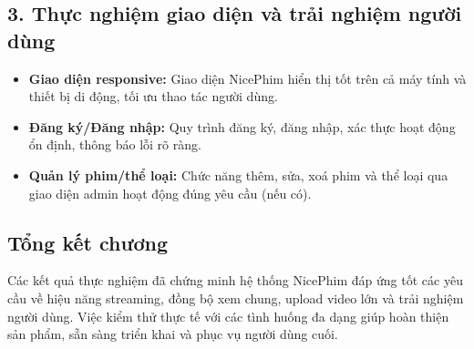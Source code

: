\subsection{3. Thực nghiệm giao diện và trải nghiệm người dùng}
\begin{itemize}
	\item \textbf{Giao diện responsive:} Giao diện NicePhim hiển thị tốt trên cả máy tính và thiết bị di động, tối ưu thao tác người dùng.
	\item \textbf{Đăng ký/Đăng nhập:} Quy trình đăng ký, đăng nhập, xác thực hoạt động ổn định, thông báo lỗi rõ ràng.
	\item \textbf{Quản lý phim/thể loại:} Chức năng thêm, sửa, xoá phim và thể loại qua giao diện admin hoạt động đúng yêu cầu (nếu có).
\end{itemize}

\subsection{Tổng kết chương}
Các kết quả thực nghiệm đã chứng minh hệ thống NicePhim đáp ứng tốt các yêu cầu về hiệu năng streaming, đồng bộ xem chung, upload video lớn và trải nghiệm người dùng. Việc kiểm thử thực tế với các tình huống đa dạng giúp hoàn thiện sản phẩm, sẵn sàng triển khai và phục vụ người dùng cuối.
